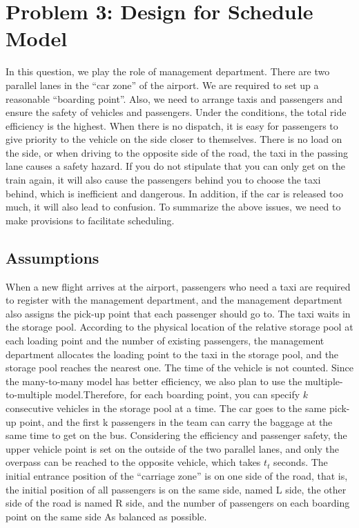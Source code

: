 \section{Problem 3: Design for Schedule Model}
In this question, we play the role of management department. There are two parallel lanes in the “car zone” of the airport. We are required to set up a reasonable “boarding point”. Also, we need to arrange taxis and passengers and ensure the safety of vehicles and passengers. Under the conditions, the total ride efficiency is the highest. 
When there is no dispatch, it is easy for passengers to give priority to the vehicle on the side closer to themselves. There is no load on the side, or when driving to the opposite side of the road, the taxi in the passing lane causes a safety hazard. If you do not stipulate that you can only get on the train again, it will also cause the passengers behind you to choose the taxi behind, which is inefficient and dangerous. In addition, if the car is released too much, it will also lead to confusion. 
To summarize the above issues, we need to make provisions to facilitate scheduling.
\subsection{Assumptions}
\begin{sloppypar}
When a new flight arrives at the airport, passengers who need a taxi are required to register with the management department, and the management department also assigns the pick-up point that each passenger should go to. The taxi waits in the storage pool. According to the physical location of the relative storage pool at each loading point and the number of existing passengers, the management department allocates the loading point to the taxi in the storage pool, and the storage pool reaches the nearest one. The time of the vehicle is not counted. Since the many-to-many model has better efficiency, we also plan to use the multiple-to-multiple model.Therefore, for each boarding point, you can specify $k$ consecutive vehicles in the storage pool at a time. The car goes to the 
same pick-up point, and the first k passengers in the team can carry the 
baggage at the same time to get on the bus. Considering the efficiency and passenger safety, the upper vehicle point is set on the outside of the two parallel 
lanes, and only the overpass can be reached to the opposite vehicle, which
takes $t_{t}$ seconds.
The initial entrance position of the “carriage zone” is on one side of the
road, that is, the initial position of all passengers is on the same side,
named L side, the other side of the road is named R side, and the number 
of passengers on each boarding point on the same side As balanced as 
possible.
\end{sloppypar}
